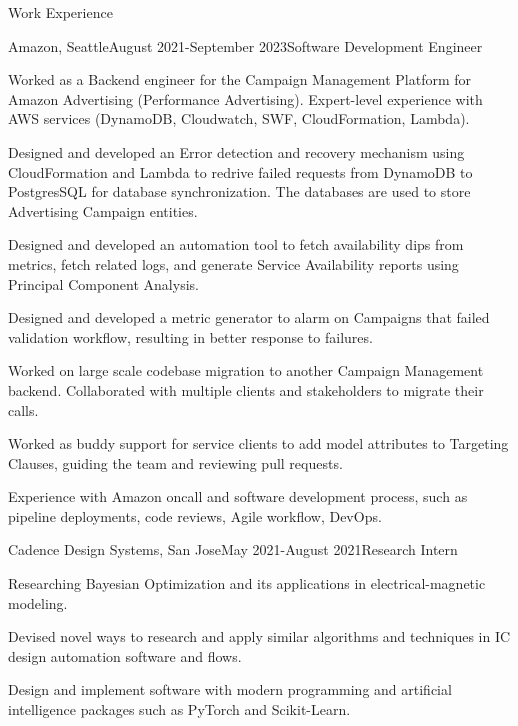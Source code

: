\documentclass{resume} %
\begin{document}
\begin{rSection}{Work Experience}

\begin{rSubsection}{Amazon, Seattle}{August 2021-September 2023}{Software Development Engineer}{} 
    \item Worked as a Backend engineer for the Campaign Management Platform for Amazon Advertising (Performance Advertising). Expert-level experience with AWS services (DynamoDB, Cloudwatch, SWF, CloudFormation, Lambda).
    \item Designed and developed an Error detection and recovery mechanism using CloudFormation and Lambda to redrive failed requests from DynamoDB to PostgresSQL for database synchronization. The databases are used to store Advertising Campaign entities. 
    \item Designed and developed an automation tool to fetch availability dips from metrics, fetch related logs, and generate Service Availability reports using Principal Component Analysis. 
    \item Designed and developed a metric generator to alarm on Campaigns that failed validation workflow, resulting in better response to failures.
    \item Worked on large scale codebase migration to another Campaign Management backend.  Collaborated with multiple clients and stakeholders to migrate their calls.
    \item Worked as buddy support for service clients to add model attributes to Targeting Clauses, guiding the team and reviewing pull requests.
    \item Experience with Amazon oncall and software development process, such as pipeline deployments, code reviews, Agile workflow, DevOps. 
\end{rSubsection}

\begin{rSubsection}{Cadence Design Systems, San Jose}{May 2021-August 2021}{Research Intern}{} 
    \item Researching Bayesian Optimization and its applications in electrical-magnetic modeling. 
    \item Devised novel ways to research and apply similar algorithms and techniques in IC design automation software and flows. 
    \item Design and implement software with modern programming and artificial intelligence packages such as PyTorch and Scikit-Learn.
\end{rSubsection}


\end{rSection}
\end{document}
